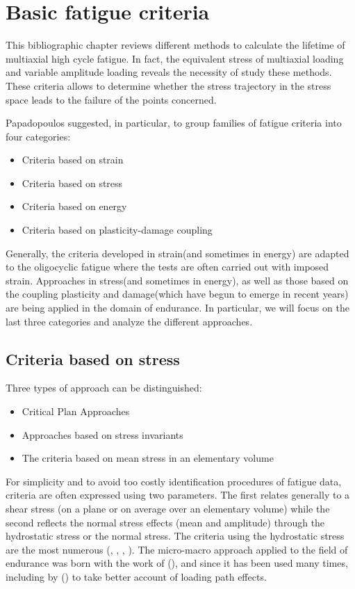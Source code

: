 \section{Basic fatigue criteria }
This bibliographic chapter reviews different methods to calculate the lifetime of multiaxial high cycle fatigue. In fact, the equivalent stress of multiaxial loading and variable amplitude loading reveals the necessity of study these methods. These criteria allows to determine whether the stress trajectory in the stress space leads to the failure of the points concerned.

Papadopoulos suggested, in particular, to group families of fatigue criteria into four categories:
\begin{itemize}
	\item Criteria based on strain
	\item Criteria based on stress
	\item Criteria based on energy
	\item Criteria based on plasticity-damage coupling
\end{itemize}
Generally, the criteria developed in strain(and sometimes in energy) are adapted to the oligocyclic fatigue where the tests are often carried out with imposed strain. Approaches in stress(and sometimes in energy), as well as those based on the coupling plasticity and damage(which have begun to emerge in recent years) are being applied in the domain of endurance. In particular, we will focus on the last three categories and analyze the different approaches.

\subsection{Criteria based on stress}
\vspace{6pt}

Three types of approach can be distinguished:
\begin{itemize}
	\item Critical Plan Approaches
	\item Approaches based on stress invariants
	\item The criteria based on mean stress in an elementary volume
\end{itemize}
For simplicity and to avoid too costly identification procedures of fatigue data, criteria are often expressed using two
parameters. The first relates generally to a shear stress (on a plane or on average over an elementary volume) while
the second reflects the normal stress effects (mean and amplitude) through the hydrostatic stress or the normal stress.
The criteria using the hydrostatic stress are the most numerous (\cite{crossland1956effect}, \cite{sines1959behavior}, \cite{FFE:FFE452}, \cite{thu2008effet}). The micro-macro approach applied to the field of endurance was born with the work of (\cite{van1973khmu}), and since it has been used many times, including by (\cite{papadopoulos1993fatigue}) to take better account of loading path effects.


